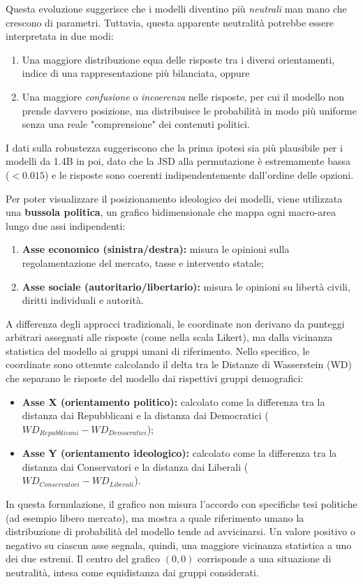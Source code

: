 \documentclass[../relazione.tex]{subfiles}
\begin{document}
Questa evoluzione suggerisce che i modelli diventino più \emph{neutrali} man mano che crescono di parametri. Tuttavia, questa apparente neutralità potrebbe essere interpretata in due modi: 
\begin{enumerate}
    \item Una maggiore distribuzione equa delle risposte tra i diversi orientamenti, indice di una rappresentazione più bilanciata, oppure
    \item Una maggiore \emph{confusione} o \emph{incoerenza} nelle risposte, per cui il modello non prende davvero posizione, ma distribuisce le probabilità in modo più uniforme senza una reale "comprensione" dei contenuti politici. 
\end{enumerate}
I dati sulla robustezza suggeriscono che la prima ipotesi sia più plausibile per i modelli da 1.4B in poi, dato che la JSD alla permutazione è estremamente bassa ($< 0.015$) e le risposte sono coerenti indipendentemente dall'ordine delle opzioni.

Per poter visualizzare il posizionamento ideologico dei modelli, viene utilizzata una \textbf{bussola politica}, un grafico bidimensionale che mappa ogni macro-area lungo due assi indipendenti:
\begin{enumerate}
    \item \textbf{Asse economico (sinistra/destra):} misura le opinioni sulla regolamentazione del mercato, tasse e intervento statale;
    \item \textbf{Asse sociale (autoritario/libertario):} misura le opinioni su libertà civili, diritti individuali e autorità.
\end{enumerate}
A differenza degli approcci tradizionali, le coordinate non derivano da punteggi arbitrari assegnati alle risposte (come nella scala Likert), ma dalla vicinanza statistica del modello ai gruppi umani di riferimento. 
Nello specifico, le coordinate sono ottenute calcolando il delta tra le Distanze di Wasserstein (WD) che separano le risposte del modello dai rispettivi gruppi demografici:
\begin{itemize}
    \item \textbf{Asse X (orientamento politico):} calcolato come la differenza tra la distanza dai Repubblicani e la distanza dai Democratici ($WD_{Repubblicani} - WD_{Democratici}$);
    \item \textbf{Asse Y (orientamento ideologico):} calcolato come la differenza tra la distanza dai Conservatori e la distanza dai Liberali ($WD_{Conservatori} - WD_{Liberali}$).
\end{itemize}
In questa formulazione, il grafico non misura l'accordo con specifiche tesi politiche (ad esempio libero mercato), ma mostra a quale riferimento umano la distribuzione di probabilità del modello tende ad avvicinarsi. Un valore positivo o negativo su ciascun asse segnala, quindi, una maggiore vicinanza statistica a uno dei due estremi. Il centro del grafico $(0,0)$ corrisponde a una situazione di neutralità, intesa come equidistanza dai gruppi considerati.
\end{document}

